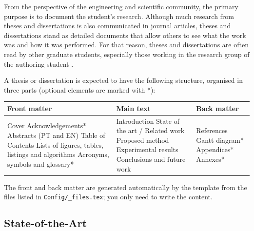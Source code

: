 From the perspective of the engineering and scientific community, the primary purpose is to document the student's research. Although much research from theses and dissertations is also communicated in journal articles, theses and dissertations stand as detailed documents that allow others to see what the work was and how it was performed. For that reason, theses and dissertations are often read by other graduate students, especially those working in the research group of the authoring student \cite{gustavii2016write, glasman2010science, chicago, strunk}. 
	
A thesis or dissertation is expected to have the following structure, organised in three parts (optional elements are marked with *):

\begin{center}
\begin{tabularx}{\linewidth}{L L L}
\toprule
\textbf{\color{iselorange}Front matter} &
\textbf{\color{iselorange}Main text} &
\textbf{\color{iselorange}Back matter} \\
\midrule
Cover \newline
Acknowledgements* \newline
Abstracts (PT and EN) \newline
Table of Contents \newline
Lists of figures, tables, listings and algorithms \newline
Acronyms, symbols and glossary*
&
Introduction \newline
State of the art / Related work \newline
Proposed method \newline
Experimental results \newline
Conclusions and future work
&
References \newline
Gantt diagram* \newline
Appendices* \newline
Annexes* \\
\bottomrule
\end{tabularx}
\end{center}

The front and back matter are generated automatically by the template from the files listed in \texttt{Config/\_files.tex}; you only need to write the content.
 
\subsection{State-of-the-Art}
\label{sec:state}

